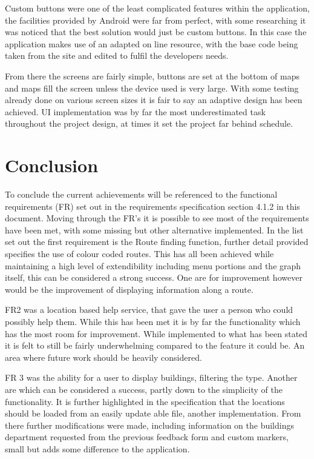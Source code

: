 Custom buttons were one of the least complicated features within the application, the facilities provided by Android were far from perfect, with some researching it was noticed that the best solution would just be custom buttons. In this case the application makes use of an adapted on line resource, with the base code being taken from the site and edited to fulfil the developers needs. 

From there the screens are fairly simple, buttons are set at the bottom of maps and maps fill the screen unless the device used is very large. With some testing already done on various screen sizes it is fair to say an adaptive design has been achieved. UI implementation was by far the most underestimated task throughout the project design, at times it set the project far behind schedule. 
\section{Conclusion}
To conclude the current achievements will be referenced to the functional requirements (FR) set out in the requirements specification section 4.1.2 in this document. Moving through the FR's it is possible to see most of the requirements have been met, with some missing but other alternative implemented. In the list set out the first requirement is the Route finding function, further detail provided specifies the use of colour coded routes. This has all been achieved while maintaining a high level of extendibility including menu portions and the graph itself, this can be considered a strong success. One are for improvement however would be the improvement of displaying information along a route. 

FR2 was a location based help service, that gave the user a person who could possibly help them. While this has been met it is by far the functionality which has the most room for improvement. While implemented to what has been stated it is felt to still be fairly underwhelming compared to the feature it could be. An area where future work should be heavily considered.

FR 3 was the ability for a user to display buildings, filtering the type. Another are which can be considered a success, partly down to the simplicity of the functionality. It is further highlighted in the specification that the locations should be loaded from an easily update able file, another implementation. From there further modifications were made, including information on the buildings department requested from the previous feedback form and custom markers, small but adds some difference to the application. 

